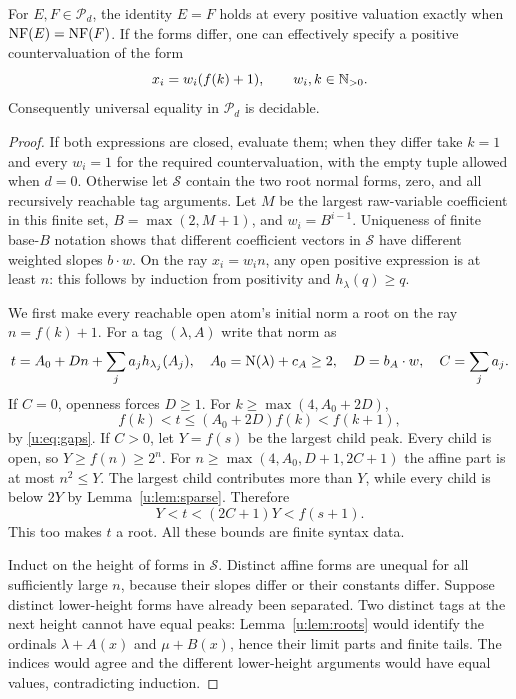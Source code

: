 \begin{theorem}\label{u:thm:identity}
For $E,F\in\mathcal P_d$, the identity $E=F$ holds at every positive
valuation exactly when $\operatorname{NF}(E)=\operatorname{NF}(F)$. If the forms differ, one can
effectively specify a positive countervaluation of the form
\begin{equation}
           x_i=w_i(f(k)+1),\qquad w_i,k\in\mathbb N_{>0}.        \label{u:display:2-2}
\end{equation}
Consequently universal equality in $\mathcal P_d$ is decidable.
\end{theorem}
\begin{proof}
If both expressions are closed, evaluate them; when they differ take
$k=1$ and every $w_i=1$ for the required countervaluation, with the
empty tuple allowed when $d=0$.  Otherwise let $\mathcal S$ contain
the two root normal forms, zero, and all recursively
reachable tag arguments. Let $M$ be the largest raw-variable coefficient
in this finite set, $B=\max(2,M+1)$, and $w_i=B^{i-1}$.
Uniqueness of finite base-$B$ notation shows that different coefficient
vectors in $\mathcal S$ have different weighted slopes $b\cdot w$.
On the ray $x_i=w_i n$, any open positive expression is at least $n$:
this follows by induction from positivity and $h_\lambda(q)\ge q$.

We first make every reachable open atom's initial norm a root on the ray
$n=f(k)+1$. For a tag $(\lambda,A)$ write that norm as
\begin{equation}
 t= A_0+Dn+\sum_j a_j h_{\lambda_j}(A_j),\quad
 A_0=\operatorname{N}(\lambda)+c_A\ge2,\quad D=b_A\cdot w,
 \quad C=\sum_j a_j.                                 \label{u:display:2-3}
\end{equation}
If $C=0$, openness forces $D\ge1$. For $k\ge\max(4,A_0+2D)$,
\[
          f(k)<t\le(A_0+2D)f(k)<f(k+1),
\]
by \eqref{u:eq:gaps}. If $C>0$, let $Y=f(s)$ be the largest child peak.
Every child is open, so $Y\ge f(n)\ge2^n$. For
$n\ge\max(4,A_0,D+1,2C+1)$ the affine part is at most $n^2\le Y$.
The largest child contributes more than $Y$, while every child is below
$2Y$ by Lemma~\ref{u:lem:sparse}. Therefore
\begin{equation}
                 Y<t<(2C+1)Y<f(s+1).                \label{u:display:2-4}
\end{equation}
This too makes $t$ a root. All these bounds are finite syntax data.

Induct on the height of forms in $\mathcal S$. Distinct affine forms are
unequal for all sufficiently large $n$, because their slopes differ or
their constants differ. Suppose distinct lower-height forms have already
been separated. Two distinct tags at the next height cannot have equal
peaks: Lemma~\ref{u:lem:roots} would identify the ordinals
$\lambda+A(x)$ and $\mu+B(x)$, hence their limit parts and finite tails.
The indices would agree and the different lower-height arguments would
have equal values, contradicting induction.


\end{proof}
